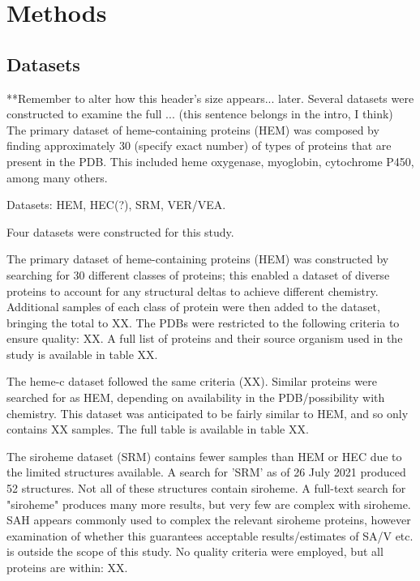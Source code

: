 \chapter{Methods}
	

	\section*{Datasets}
	**Remember to alter how this header's size appears... later.
	Several datasets were constructed to examine the full ... (this sentence belongs in the intro, I think)
	The primary dataset of heme-containing proteins (HEM) was composed by finding approximately 30 (specify exact number) of types of proteins that are present in the PDB. This included heme oxygenase, myoglobin, cytochrome P450, among many others.
	
	Datasets: HEM, HEC(?), SRM, VER/VEA.
	
	Four datasets were constructed for this study.
	
	The primary dataset of heme-containing proteins (HEM) was constructed by searching for 30 different classes of proteins; this enabled a dataset of diverse proteins to account for any structural deltas to achieve different chemistry. Additional samples of each class of protein were then added to the dataset, bringing the total to XX. The PDBs were restricted to the following criteria to ensure quality: XX. A full list of proteins and their source organism used in the study is available in table XX.
	
	The heme-c dataset followed the same criteria (XX). Similar proteins were searched for as HEM, depending on availability in the PDB/possibility with chemistry. This dataset was anticipated to be fairly similar to HEM, and so only contains XX samples. The full table is available in table XX. 
	
	The siroheme dataset (SRM) contains fewer samples than HEM or HEC due to the limited structures available. A search for 'SRM' as of 26 July 2021 produced 52 structures. Not all of these structures contain siroheme. A full-text search for "siroheme" produces many more results, but very few are complex with siroheme. SAH appears commonly used to complex the relevant siroheme proteins, however examination of whether this guarantees acceptable results/estimates of SA/V etc. is outside the scope of this study. No quality criteria were employed, but all proteins are within: XX.
	
